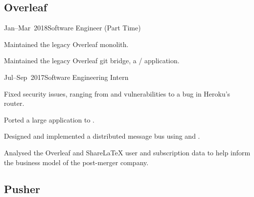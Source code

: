 \documentclass[a4paper]{barrucadu-cv}
\newcommand{\range}[2]{#1–#2}
\begin{document}
\subsection{Overleaf}

\begin{cventry}{\range{Jan}{Mar}~2018}{Software Engineer (Part Time)}
  \begin{tightitemize}
  \item Maintained the legacy Overleaf  monolith.

  \item Maintained the legacy Overleaf git bridge, a 
    /  application.
  \end{tightitemize}
\end{cventry}

\begin{cventry}{\range{Jul}{Sep}~2017}{Software Engineering Intern}
  \begin{tightitemize}
  \item Fixed security issues, ranging from  and
     vulnerabilities to a bug in Heroku's router.

  \item Ported a large  application to .

  \item Designed and implemented a distributed message bus using
     and .

  \item Analysed the Overleaf and ShareLaTeX user and subscription
    data to help inform the business model of the post-merger company.
  \end{tightitemize}
\end{cventry}

\subsection{Pusher}
\end{document}
